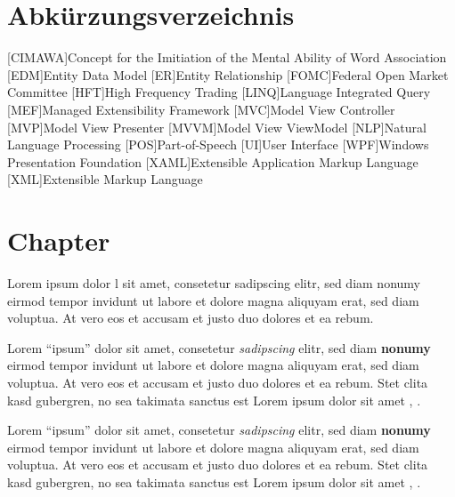 \documentclass[
        ngerman,
        paper=a4,
        numbers=noendperiod,
]{scrreprt}
\begin{document}
\chapter*{Abkürzungsverzeichnis}
\begin{acronym}
[CIMAWA]{Concept for the Imitiation of the Mental Ability of Word Association}
[EDM]{Entity Data Model}
[ER]{Entity Relationship}
[FOMC]{Federal Open Market Committee}
[HFT]{High Frequency Trading}
[LINQ]{Language Integrated Query}
[MEF]{Managed Extensibility Framework}
[MVC]{Model View Controller}
[MVP]{Model View Presenter}
[MVVM]{Model View ViewModel}
[NLP]{Natural Language Processing}
[POS]{Part-of-Speech}
[UI]{User Interface}
[WPF]{Windows Presentation Foundation}
[XAML]{Extensible Application Markup Language}
[XML]{Extensible Markup Language}
\end{acronym}
\clearpage 
{} 
\listofxequations
\clearpage
\setcounter{page}{1}

\chapter{Chapter}
Lorem  \cite[vgl. S.3]{van2018argumentation} ipsum dolor l \cite[S. 265]{kahneman}  sit amet, consetetur sadipscing elitr, sed diam nonumy eirmod tempor invidunt ut labore et dolore magna aliquyam erat, sed diam voluptua. 
At vero eos et accusam et justo duo dolores et ea rebum. 

Lorem \enquote{ipsum} dolor sit amet, consetetur \textit{sadipscing} elitr, sed diam \textbf{nonumy} eirmod tempor invidunt ut labore et dolore magna aliquyam erat, sed diam voluptua. 
At vero eos et accusam et justo duo dolores et ea rebum. 
Stet clita kasd gubergren, no sea takimata sanctus est Lorem ipsum dolor sit amet \citep[]{eff65}, \citep[]{eff70}. 

Lorem \enquote{ipsum} dolor sit amet, consetetur \textit{sadipscing} elitr, sed diam \textbf{nonumy} eirmod tempor invidunt ut labore et dolore magna aliquyam erat, sed diam voluptua. 
At vero eos et accusam et justo duo dolores et ea rebum. 
Stet clita kasd gubergren, no sea takimata sanctus est Lorem ipsum dolor sit amet \citep[]{eff65}, \citep[]{eff70}. 
\end{document}
